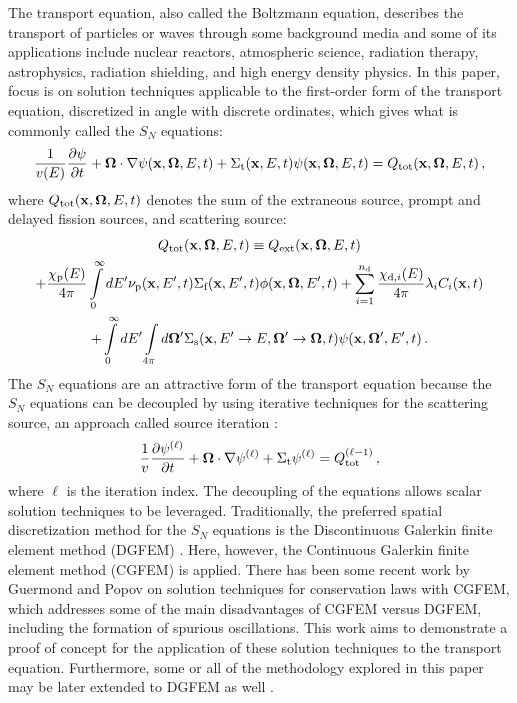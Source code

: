 The transport equation, also called the Boltzmann equation, describes the
transport of particles or waves through some background media and some
of its applications include nuclear reactors, atmospheric science, radiation
therapy, astrophysics, radiation shielding, and high energy density physics.
In this paper, focus is on solution techniques applicable to the first-order
form of the transport equation, discretized in angle with discrete ordinates,
which gives what is commonly called the $S_N$ equations:
\begin{equation}\label{eq:transport_scalar}
  \frac{1}{v(E)}\frac{\partial \psi}{\partial t} + \mathbf{\Omega}\cdot\nabla\psi(\mathbf{x},\mathbf{\Omega},E,t)
    + \Sigma_\textup{t}(\mathbf{x},E,t)\psi(\mathbf{x},\mathbf{\Omega},E,t) = Q_\textup{tot}(\mathbf{x},\mathbf{\Omega},E,t)
  \,,
\end{equation}
where $Q_\textup{tot}(\mathbf{x},\mathbf{\Omega},E,t)$ denotes the sum of the extraneous source, prompt and delayed
fission sources, and scattering source:
\begin{multline}
  Q_\textup{tot}(\mathbf{x},\mathbf{\Omega},E,t) \equiv Q_\textup{ext}(\mathbf{x},\mathbf{\Omega},E,t)\\
    + \frac{\chi_\text{p}(E)}{4\pi}\int\limits_0^\infty
      dE'\nu_\text{p}(\mathbf{x},E',t)\Sigma_\textup{f}(\mathbf{x},E',t)\phi(\mathbf{x},\mathbf{\Omega},E',t)
    + \sum\limits_{i=1}^{n_\text{d}}\frac{\chi_{\text{d},i}(E)}{4\pi}\lambda_i C_i(\mathbf{x},t)\\
    + \int\limits_0^\infty dE'\int\limits_{4\pi}d\mathbf{\Omega}'
      \Sigma_\textup{s}(\mathbf{x},E'\rightarrow E,\mathbf{\Omega}'\rightarrow\mathbf{\Omega},t)\psi(\mathbf{x},\mathbf{\Omega}',E',t)
  \,.
\end{multline}
The $S_N$ equations are an attractive form of the transport equation because
the $S_N$ equations can be decoupled by using iterative techniques for the
scattering source, an approach called source iteration \cite{glasstone}:
\begin{equation}
  \frac{1}{v}\frac{\partial \psi^{(\ell)}}{\partial t}
    + \mathbf{\Omega}\cdot\nabla\psi^{(\ell)}
    + \Sigma_\textup{t}\psi^{(\ell)} = Q_\textup{tot}^{(\ell-1)} \,,
\end{equation}
where $\ell$ is the iteration index. The decoupling of the equations allows
scalar solution techniques to be leveraged.
Traditionally, the preferred spatial discretization method for the $S_N$
equations is the Discontinuous Galerkin finite element method (DGFEM)
\cite{Lesaint1974}\cite{Reed_Hill_1973}. Here, however, the
Continuous Galerkin finite element method (CGFEM) is applied. There
has been some recent work by Guermond and Popov \cite{guermond_ev} on
solution techniques for conservation laws with CGFEM, which addresses some
of the main disadvantages of CGFEM versus DGFEM, including the formation
of spurious oscillations. This work aims to demonstrate a proof of concept
for the application of these solution techniques to the transport equation.
Furthermore, some or all of the methodology explored in this paper may be
later extended to DGFEM as well \cite{zingan_2013}.

